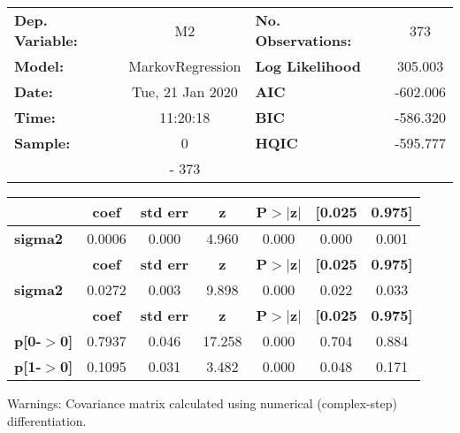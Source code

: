 \begin{center}
\begin{tabular}{lclc}
\toprule
\textbf{Dep. Variable:} &        M2        & \textbf{  No. Observations:  } &    373      \\
\textbf{Model:}         & MarkovRegression & \textbf{  Log Likelihood     } &  305.003    \\
\textbf{Date:}          & Tue, 21 Jan 2020 & \textbf{  AIC                } &  -602.006   \\
\textbf{Time:}          &     11:20:18     & \textbf{  BIC                } &  -586.320   \\
\textbf{Sample:}        &        0         & \textbf{  HQIC               } &  -595.777   \\
\textbf{}               &       - 373      & \textbf{                     } &             \\
\bottomrule
\end{tabular}
\begin{tabular}{lcccccc}
                & \textbf{coef} & \textbf{std err} & \textbf{z} & \textbf{P$>$$|$z$|$} & \textbf{[0.025} & \textbf{0.975]}  \\
\midrule
\textbf{sigma2} &       0.0006  &        0.000     &     4.960  &         0.000        &        0.000    &        0.001     \\
                & \textbf{coef} & \textbf{std err} & \textbf{z} & \textbf{P$>$$|$z$|$} & \textbf{[0.025} & \textbf{0.975]}  \\
\midrule
\textbf{sigma2} &       0.0272  &        0.003     &     9.898  &         0.000        &        0.022    &        0.033     \\
                   & \textbf{coef} & \textbf{std err} & \textbf{z} & \textbf{P$>$$|$z$|$} & \textbf{[0.025} & \textbf{0.975]}  \\
\midrule
\textbf{p[0-$>$0]} &       0.7937  &        0.046     &    17.258  &         0.000        &        0.704    &        0.884     \\
\textbf{p[1-$>$0]} &       0.1095  &        0.031     &     3.482  &         0.000        &        0.048    &        0.171     \\
\bottomrule
\end{tabular}
\end{center}

Warnings: \newline
 [1] Covariance matrix calculated using numerical (complex-step) differentiation.